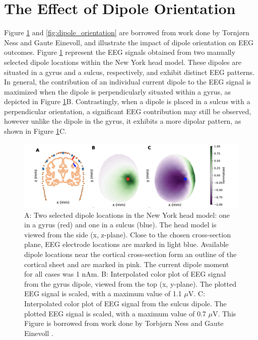 \documentclass[a4paper, UKenglish, 11pt]{uiomaster}
\begin{document}
\section{The Effect of Dipole Orientation}
Figure \ref{fig:gyrus_and_sulcus_EEG} and \ref{fig:dipole_orientation} are borrowed from work done by Tornjørn Ness and Gaute Einevoll, and illustrate the impact of dipole orientation on EEG outcomes. Figure \ref{fig:gyrus_and_sulcus_EEG} represent the EEG signals obtained from two manually selected dipole locations within the New York head model. These dipoles are situated in a gyrus and a sulcus, respectively, and exhibit distinct EEG patterns. In general, the contribution of an individual current dipole to the EEG signal is maximized when the dipole is perpendicularly situated within a gyrus, as depicted in Figure \ref{fig:gyrus_and_sulcus_EEG}B. Contrastingly, when a dipole is placed in a sulcus with a perpendicular orientation, a significant EEG contribution may still be observed, however unlike the dipole in the gyrus, it exhibits a more dipolar pattern, as shown in Figure \ref{fig:gyrus_and_sulcus_EEG}C.


\begin{figure}[!htb]
    \centering
    \includegraphics[width=\linewidth]{figures/gyrus_and_sulcus_EEG.png}
    \caption{A: Two selected dipole locations in the New York head model: one in a gyrus (red) and one in a sulcus (blue). The head model is viewed from the side (x, z-plane). Close to the chosen cross-section plane, EEG electrode locations are marked in light blue. Available dipole locations near the cortical cross-section form an outline of the cortical sheet and are marked in pink. The current dipole moment for all cases was 1 nAm. B: Interpolated color plot of EEG signal from the gyrus dipole, viewed from the top (x, y-plane). The plotted EEG signal is scaled, with a maximum value of 1.1 $\mu$V. C: Interpolated color plot of EEG signal from the sulcus dipole. The plotted EEG signal is scaled, with a maximum value of 0.7 $\mu$V. This Figure is borrowed from work done by Torbjørn Ness and Gaute Einevoll \cite{naess2021biophysically}.}
    \label{fig:gyrus_and_sulcus_EEG}
\end{figure}
\end{document}
